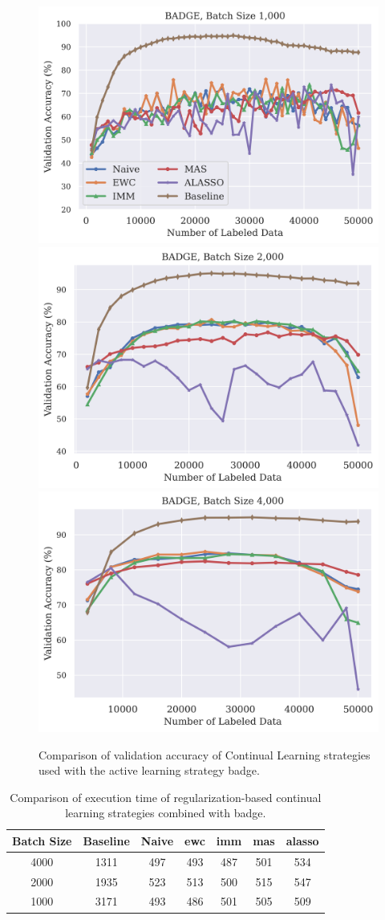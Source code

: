 \begin{figure}[h]
    \centering
    \includegraphics[width=0.32\linewidth]{images/results_CAL/badge_1000b_Comp.png} \hfill
    \includegraphics[width=0.32\linewidth]{images/results_CAL/badge_2000b_acc.png} \hfill
    \includegraphics[width=0.32\linewidth]{images/results_CAL/badge_4000b_acc.png}
    \caption[Continual active learning with \gls{badge} with varying batch size]{Comparison of validation accuracy of Continual Learning strategies used with the active learning strategy
    \gls{badge}.}
    \label{fig:Evaluation:CAL:VaryBatchSizeAcc}
\end{figure}


\begin{table}[h]
    \centering
    \begin{tabular}{c | c c c c c c} 
        Batch Size & Baseline & Naive & \gls{ewc} & \gls{imm} & \gls{mas} & \gls{alasso}\\ 
        \hline 
        4000 & 1311 & 497 & 493 & 487 & 501 & 534 \\
        2000 & 1935 & 523 & 513 & 500 & 515 & 547 \\
        1000 & 3171 & 493 & 486 & 501 & 505 & 509 \\
    \end{tabular}
    \caption{Comparison of execution time of regularization-based continual learning strategies
    combined with \gls{badge}.}
    \label{fig:Evaluation:CAL:BadgeVaryBatchSizeTime}
\end{table}

